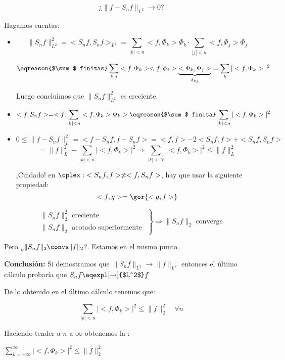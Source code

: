 		\[ \text{¿} \| f - S_n f \|_{L^2} \rightarrow 0 \text{?}\]

		Hagamos cuentas:

		\begin{itemize}

			\item
			\[ \|S_n f\|_{L^2}^2 = < S_n f, S_n f>_{L^2} = \sum_{|k| < n} <f, \Phi_k> \Phi_k \cdot \sum_{|j| < n} <f, \Phi_j> \Phi_j \]

			\[ \eqreason{$\sum$ finitas} \sum_{k,j} <f, \Phi_k><f, \phi_j>\underbrace{<\Phi_k, \Phi_j>}_{\delta_{kj}} = \sum_k | <f, \Phi_k> |^2
			\]

			Luego concluimos que $\|S_n f\|_{L^2}^2$ es creciente.

			\item
			\[
				<f, S_n f> = <f, \sum_{|k| < n} <f, \Phi_k> \Phi_k > \eqreason{$\sum$ finita} \sum_{|k| < n} | <f, \Phi_k> |^2
			\]

			\item
			\[
				0 \leq \|f - S_n f\|^2_{L} = <f - S_n f, f- S_n f> = <f,f> - 2 <S_n f, f> + <S_n f, S_n f>
			\]
			\[ = \|f\|_{L}^2 - \sum_{|k| < n} |<f, \Phi_k>|^2 \Rightarrow \sum_{|k| < N} |<f, \Phi_k>|^2 \leq \|f\|_L^2 \]

			\obs ¡Cuidado! en $\cplex: \ <S_n f, f> \neq < f, S_n f>$, hay que usar la siguiente propiedad:
			$$<f,g> = \gor{<g,f>} $$
		\end{itemize}

		\obs  \[
			\left.
			\begin{array}{l}
				\|S_n f\|^2_2 \text{ creciente } \\
				\|S_n f\|_2 \text{ acotado superiormente }
			\end{array}
			\right\} \Rightarrow \|S_n f\|_{2} \text{ converge }
		\]

		Pero ¿$\|S_n f\|_2 \convs \| f \|_2$?. Estamos en el mismo punto.

		\textbf{Conclusión:} Si demostramos que  $\|S_n f\|_{L^2} \rightarrow \| f \|_{L^2}$ entonces el último cálculo probaría que $S_n f \eqexpl[\rightarrow]{$L^2$} f$

		\obs De lo obtenido en el último cálculo tenemos que:

			\[ \sum_{|k| < n} |<f, \Phi_k>|^2 \leq \|f\|_2^2 \quad \forall n \]

			Haciendo tender a $n$ a $\infty$ obtenemos la :

			\( \sum_{k=-\infty}^\infty |<f, \Phi_k>|^2 \leq \|f\|_2^2 \label{eq:desigualdad_bessel}  \)

